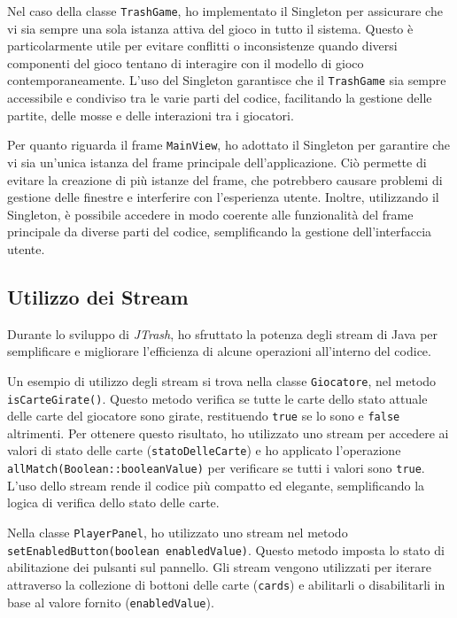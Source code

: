 Nel caso della classe \texttt{TrashGame}, ho implementato il Singleton per assicurare che vi sia sempre una sola istanza attiva del gioco in tutto il sistema. Questo è particolarmente utile per evitare conflitti o inconsistenze quando diversi componenti del gioco tentano di interagire con il modello di gioco contemporaneamente. L'uso del Singleton garantisce che il \texttt{TrashGame} sia sempre accessibile e condiviso tra le varie parti del codice, facilitando la gestione delle partite, delle mosse e delle interazioni tra i giocatori.

Per quanto riguarda il frame \texttt{MainView}, ho adottato il Singleton per garantire che vi sia un'unica istanza del frame principale dell'applicazione. Ciò permette di evitare la creazione di più istanze del frame, che potrebbero causare problemi di gestione delle finestre e interferire con l'esperienza utente. Inoltre, utilizzando il Singleton, è possibile accedere in modo coerente alle funzionalità del frame principale da diverse parti del codice, semplificando la gestione dell'interfaccia utente.

\subsection{Utilizzo dei Stream}
Durante lo sviluppo di \textit{JTrash}, ho sfruttato la potenza degli stream di Java per semplificare e migliorare l'efficienza di alcune operazioni all'interno del codice.

Un esempio di utilizzo degli stream si trova nella classe \texttt{Giocatore}, nel metodo \texttt{isCarteGirate()}. Questo metodo verifica se tutte le carte dello stato attuale delle carte del giocatore sono girate, restituendo \texttt{true} se lo sono e \texttt{false} altrimenti. Per ottenere questo risultato, ho utilizzato uno stream per accedere ai valori di stato delle carte (\texttt{statoDelleCarte}) e ho applicato l'operazione \texttt{allMatch(Boolean::booleanValue)} per verificare se tutti i valori sono \texttt{true}. L'uso dello stream rende il codice più compatto ed elegante, semplificando la logica di verifica dello stato delle carte.

Nella classe \texttt{PlayerPanel}, ho utilizzato uno stream nel metodo \texttt{setEnabledButton(boolean enabledValue)}. Questo metodo imposta lo stato di abilitazione dei pulsanti sul pannello. Gli stream vengono utilizzati per iterare attraverso la collezione di bottoni delle carte (\texttt{cards}) e abilitarli o disabilitarli in base al valore fornito (\texttt{enabledValue}).

